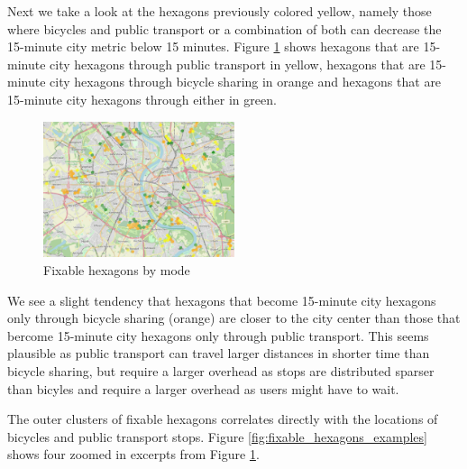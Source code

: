 Next we take a look at the hexagons previously colored yellow, namely those where bicycles and public transport or a combination of both can decrease the 15-minute city metric below 15 minutes.
Figure \ref{fig:fixable_hexagons} shows hexagons that are 15-minute city hexagons through public transport in yellow, hexagons that are 15-minute city hexagons through bicycle sharing in orange and hexagons that are 15-minute city hexagons through either in green.

\begin{figure}
  \begin{center}
    \includegraphics[width=0.50\textwidth]{Figures/results/problematic_hexagons/fixable_hexagons}
  \end{center}
  \caption{Fixable hexagons by mode}
  \label{fig:fixable_hexagons}
\end{figure}

We see a slight tendency that hexagons that become 15-minute city hexagons only through bicycle sharing (orange) are closer to the city center than those that bercome 15-minute city hexagons only through public transport. 
This seems plausible as public transport can travel larger distances in shorter time than bicycle sharing, but require a larger overhead as stops are distributed sparser than bicyles and require a larger overhead as users might have to wait.

The outer clusters of fixable hexagons correlates directly with the locations of bicycles and public transport stops.
Figure \ref{fig:fixable_hexagons_examples} shows four zoomed in excerpts from Figure \ref{fig:fixable_hexagons}.


